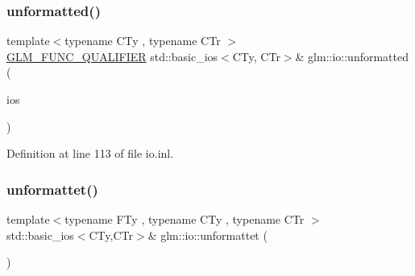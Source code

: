 \subsubsection{\texorpdfstring{unformatted()}{unformatted()}}
{\footnotesize\ttfamily template$<$typename C\+Ty , typename C\+Tr $>$ \\
\mbox{\hyperlink{setup_8hpp_a33fdea6f91c5f834105f7415e2a64407}{G\+L\+M\+\_\+\+F\+U\+N\+C\+\_\+\+Q\+U\+A\+L\+I\+F\+I\+ER}} std\+::basic\+\_\+ios$<$C\+Ty, C\+Tr$>$\& glm\+::io\+::unformatted (\begin{DoxyParamCaption}\item[{std\+::basic\+\_\+ios$<$ C\+Ty, C\+Tr $>$ \&}]{ios }\end{DoxyParamCaption})}



Definition at line 113 of file io.\+inl.

\mbox{\label{namespaceglm_1_1io_a3095de031a9c7c3dd9bab670381c3cdb}} 
\subsubsection{\texorpdfstring{unformattet()}{unformattet()}}
{\footnotesize\ttfamily template$<$typename F\+Ty , typename C\+Ty , typename C\+Tr $>$ \\
std\+::basic\+\_\+ios$<$C\+Ty,C\+Tr$>$\& glm\+::io\+::unformattet (\begin{DoxyParamCaption}\item[{std\+::basic\+\_\+ios$<$ C\+Ty, C\+Tr $>$ \&}]{ }\end{DoxyParamCaption})}

